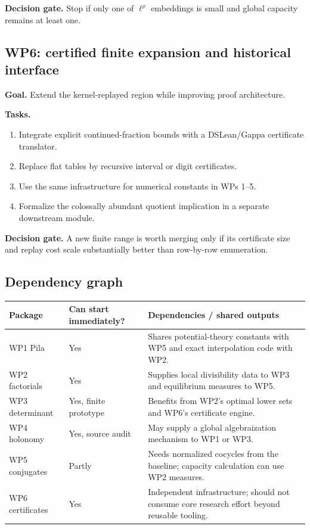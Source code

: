 \documentclass[10pt,letterpaper]{article}
\begin{document}
\textbf{Decision gate.}  Stop if only one of \(\ell^\rho\) embeddings is small and global
capacity remains at least one.

\subsection{WP6: certified finite expansion and historical interface}

\textbf{Goal.}  Extend the kernel-replayed region while improving proof architecture.

\textbf{Tasks.}
\begin{enumerate}
\item Integrate explicit continued-fraction bounds with a DSLean/Gappa certificate
translator.
\item Replace flat tables by recursive interval or digit certificates.
\item Use the same infrastructure for numerical constants in WPs 1--5.
\item Formalize the colossally abundant quotient implication in a separate downstream
module.
\end{enumerate}

\textbf{Decision gate.}  A new finite range is worth merging only if its certificate size and
replay cost scale substantially better than row-by-row enumeration.

\subsection{Dependency graph}

\begin{center}
\small
\begin{tabularx}{0.94\textwidth}{L{0.18\textwidth}L{0.28\textwidth}Y}
\toprule
Package & Can start immediately? & Dependencies / shared outputs\\
\midrule
WP1 Pila & Yes & Shares potential-theory constants with WP5 and exact interpolation code with
WP2.\\
WP2 factorials & Yes & Supplies local divisibility data to WP3 and equilibrium measures to
WP5.\\
WP3 determinant & Yes, finite prototype & Benefits from WP2's optimal lower sets and WP6's
certificate engine.\\
WP4 holonomy & Yes, source audit & May supply a global algebraization mechanism to WP1 or
WP3.\\
WP5 conjugates & Partly & Needs normalized cocycles from the baseline; capacity calculation
can use WP2 measures.\\
WP6 certificates & Yes & Independent infrastructure; should not consume core research effort
beyond reusable tooling.\\
\bottomrule
\end{tabularx}
\end{center}
\end{document}
